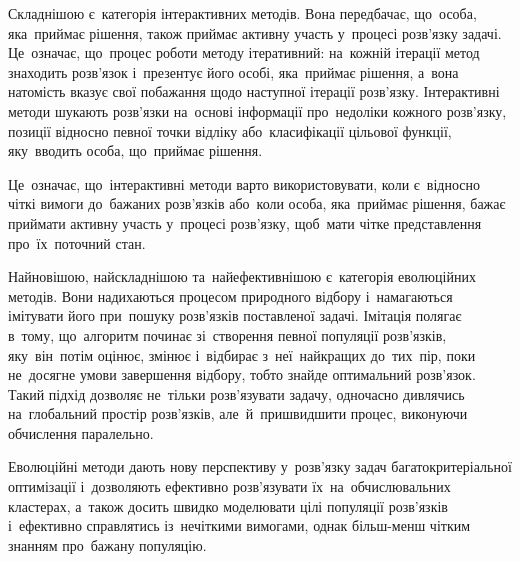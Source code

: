 \documentclass[
  a4paper,
  oneside,
  BCOR = 10mm,
  DIV = 12,
  12pt,
  headings = normal,
]{scrartcl}
\begin{document}
    Складнішою є~категорія інтерактивних методів. Вона передбачає, що~особа, яка~приймає рішення, також приймає активну участь у~процесі розв'язку задачі. Це~означає, що~процес роботи методу ітеративний: на~кожній ітерації метод знаходить розв'язок і~презентує його особі, яка~приймає рішення, а~вона натомість вказує свої побажання щодо наступної ітерації розв'язку. Інтерактивні методи шукають розв'язки на~основі інформації про~недоліки кожного розв'язку, позиції відносно певної точки відліку або~класифікації цільової функції, яку~вводить особа, що~приймає рішення.

    Це~означає, що~інтерактивні методи варто використовувати, коли є~відносно чіткі вимоги до~бажаних розв'язків або~коли особа, яка~приймає рішення, бажає приймати активну участь у~процесі розв'язку, щоб~мати чітке представлення про~їх~поточний стан.

    Найновішою, найскладнішою та~найефективнішою є~категорія еволюційних методів. Вони надихаються процесом природного відбору і~намагаються імітувати його при~пошуку розв'язків поставленої задачі. Імітація полягає в~тому, що~алгоритм починає зі~створення певної популяції розв'язків, яку~він~потім оцінює, змінює і~відбирає з~неї~найкращих до~тих~пір, поки не~досягне умови завершення відбору, тобто знайде оптимальний розв'язок. Такий підхід дозволяє не~тільки розв'язувати задачу, одночасно дивлячись на~глобальний простір розв'язків, але~й~пришвидшити процес, виконуючи обчислення паралельно.

    Еволюційні методи дають нову перспективу у~розв'язку задач багатокритеріальної оптимізації і~дозволяють ефективно розв'язувати їх~на~обчислювальних кластерах, а~також досить швидко моделювати цілі популяції розв'язків і~ефективно справлятись із~нечіткими вимогами, однак більш-менш чітким знанням про~бажану популяцію.

  \clearpage
  \printbibliography
\end{document}
